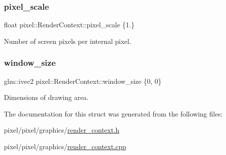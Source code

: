 \subsubsection{\texorpdfstring{pixel\+\_\+scale}{pixel\_scale}}
{\footnotesize\ttfamily float pixel\+::\+Render\+Context\+::pixel\+\_\+scale \{1.\}}



Number of screen pixels per internal pixel. 

\mbox{\label{structpixel_1_1_render_context_aca15b0c7467b431a824c5adaf8286fbb}} 
\subsubsection{\texorpdfstring{window\+\_\+size}{window\_size}}
{\footnotesize\ttfamily glm\+::ivec2 pixel\+::\+Render\+Context\+::window\+\_\+size \{0, 0\}}



Dimensions of drawing area. 



The documentation for this struct was generated from the following files\+:\begin{DoxyCompactItemize}
\item 
pixel/pixel/graphics/\hyperlink{render__context_8h}{render\+\_\+context.\+h}\item 
pixel/pixel/graphics/\hyperlink{render__context_8cpp}{render\+\_\+context.\+cpp}\end{DoxyCompactItemize}
